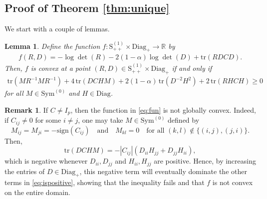 \documentclass[12pt]{amsart}
\numberwithin{equation}{section}
\numberwithin{equation}{section}
\theoremstyle{plain}
\newtheorem{lemma}{Lemma}
\theoremstyle{definition}
\newtheorem{remark}{Remark}
\newcommand{\tr}{\mathrm{tr}}
\newcommand{\Sppone}{\mathrm{S}_{++}^{(1)}}
\newcommand{\Szero}{\mathrm{Sym}^{(0)}}
\newcommand{\R}{\mathbb{R}}
\newcommand{\sign}{\mathrm{sign}}
\newcommand{\Diag}{\mathrm{Diag}}
\newcommand{\Diagp}{\mathrm{Diag}_+}
\begin{document}
\subsection{Proof of Theorem \ref{thm:unique}}

We start with a couple of lemmas. 

\begin{lemma}\label{lem:convex}
Define the function $f\colon \Sppone\times \Diagp\to\R$ by
\begin{align}\label{eq:fun}
f(R,D)= -\log\det(R)-2(1-\alpha)\log \det(D) + \tr(R D C D).
\end{align}
Then, $f$ is convex at a point $(R,D)\in \Sppone\times \Diagp$ if and only if
\begin{align}\label{eq:ispositive}
 \tr(M R^{-1} M R^{-1}) + 4\, \tr(D C H M) 
+2(1-\alpha)\, \tr(D^{-2}H^2)+2\,\tr(R H C H)\geq0
\end{align}
for all $M\in \Szero$ and $H\in\Diag$.
\end{lemma}
\begin{remark}\label{rem:not_globally_convex}
If $C\neq I_p$, then the function in \eqref{eq:fun} is not globally convex. Indeed, if $C_{ij}\neq 0$ for some $i\neq j$, one may take $M\in \Szero$ defined by 
\[
M_{ij}=M_{ji}=-\sign(C_{ij}) \quad \text{and} \quad M_{kl}=0 \quad \text{for all } (k,l)\notin\{(i,j),(j,i)\}.
\]
Then,
\[
\tr(D C H M)  = -|C_{ij}| (D_{ii} H_{jj}+D_{jj}H_{ii}),
\]
which is negative whenever $D_{ii},D_{jj}$ and $H_{ii},H_{jj}$ are positive. Hence, by increasing the entries of $D\in \Diagp$, this negative term will eventually dominate the other terms in \eqref{eq:ispositive}, showing that the inequality fails and that $f$ is not convex on the entire domain.
\end{remark}
\end{document}
